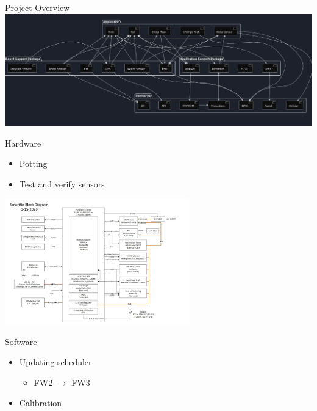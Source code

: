 \begin{frame}{Project Overview}
    \centering
    \includegraphics[height=1\textheight, width=1\textwidth, keepaspectratio]{images/sfSysArch.png}
\end{frame}

\begin{frame}{Hardware}
    \begin{itemize}
        \item Potting 
        \item Test and verify sensors
    \end{itemize}
    \centering    
    \includegraphics[height=0.6\textheight, width=0.6\textwidth, keepaspectratio]{images/schem.png}
\end{frame}

\begin{frame}{Software}
    \begin{itemize}
        \item Updating scheduler
        \begin{itemize} 
            \item FW2 $\rightarrow$ FW3
        \end{itemize}
        \item Calibration
    \end{itemize}    
\end{frame}

